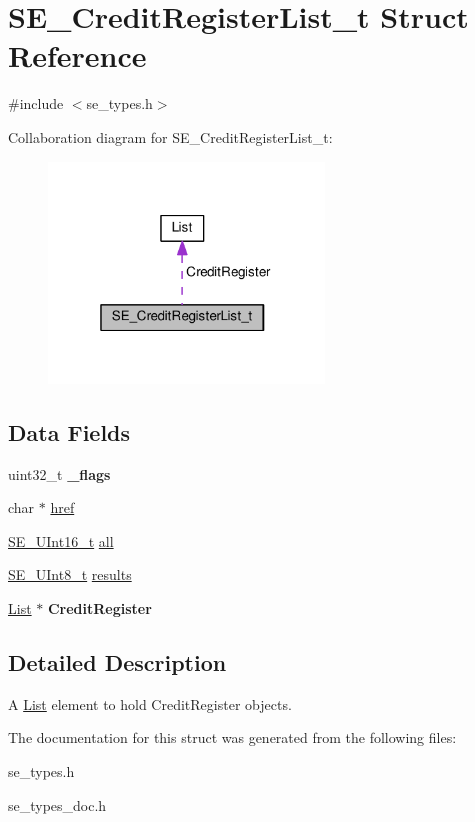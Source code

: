 \hypertarget{structSE__CreditRegisterList__t}{}\section{S\+E\+\_\+\+Credit\+Register\+List\+\_\+t Struct Reference}
\label{structSE__CreditRegisterList__t}


{\ttfamily \#include $<$se\+\_\+types.\+h$>$}



Collaboration diagram for S\+E\+\_\+\+Credit\+Register\+List\+\_\+t\+:\nopagebreak
\begin{figure}[H]
\begin{center}
\leavevmode
\includegraphics[width=208pt]{structSE__CreditRegisterList__t__coll__graph}
\end{center}
\end{figure}
\subsection*{Data Fields}
\begin{DoxyCompactItemize}
\item 
uint32\+\_\+t {\bfseries \+\_\+flags}
\item 
char $\ast$ \hyperlink{group__CreditRegisterList_gabc831c1d07e49cfadf9af91ea5ebf19d}{href}
\item 
\hyperlink{group__UInt16_gac68d541f189538bfd30cfaa712d20d29}{S\+E\+\_\+\+U\+Int16\+\_\+t} \hyperlink{group__CreditRegisterList_gab1223b63def7d1d4811bc32c4addf18d}{all}
\item 
\hyperlink{group__UInt8_gaf7c365a1acfe204e3a67c16ed44572f5}{S\+E\+\_\+\+U\+Int8\+\_\+t} \hyperlink{group__CreditRegisterList_ga4ca66cecce8ebdd10c6e4fc24350ad3c}{results}
\item 
\hyperlink{structList}{List} $\ast$ {\bfseries Credit\+Register}
\end{DoxyCompactItemize}


\subsection{Detailed Description}
A \hyperlink{structList}{List} element to hold Credit\+Register objects. 

The documentation for this struct was generated from the following files\+:\begin{DoxyCompactItemize}
\item 
se\+\_\+types.\+h\item 
se\+\_\+types\+\_\+doc.\+h\end{DoxyCompactItemize}
